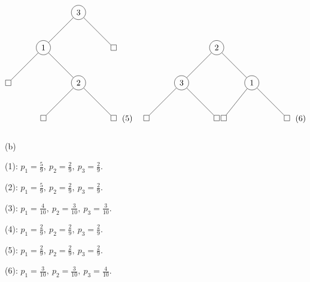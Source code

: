 \documentclass[fleqn]{article}
\begin{document}
$$
\begin{tikzpicture}
    \node(1) at (0,0)[circle, draw]{3};
    \node(2) at (-1.5,-1.5)[circle, draw]{1};
    \node(3) at (0,-3)[circle, draw]{2};
    \node(1l) at (1.5,-1.5)[draw]{};
    \node(2l) at (-3,-3)[draw]{};
    \node(3l) at (1.5,-4.5)[draw]{};
    \node(3r) at (-1.5,-4.5)[draw]{};
    \draw (1)--(2);
    \draw (1)--(1l);
    \draw (2)--(3);
    \draw (2)--(2l);
    \draw (3)--(3l);
    \draw (3)--(3r);
\end{tikzpicture} \ \ (5) \ \ \ \ 
\begin{tikzpicture}
    \node(1) at (0,0)[circle, draw]{2};
    \node(2) at (-1.5,-1.5)[circle, draw]{3};
    \node(3) at (1.5,-1.5)[circle, draw]{1};
    \node(2l) at (-3,-3)[draw]{};
    \node(2r) at (0,-3)[draw]{};
    \node(3l) at (0.3,-3)[draw]{};
    \node(3r) at (3,-3)[draw]{};
    \draw (1)--(2);
    \draw (1)--(3);
    \draw (2)--(2r);
    \draw (2)--(2l);
    \draw (3)--(3l);
    \draw (3)--(3r);
\end{tikzpicture} \ \ (6)
$$
\\
(b)

(1):  $p_1 =\frac{5}{9}, \ p_2 = \frac{2}{9}, \ p_3 = \frac{2}{9}$.

(2):  $p_1 =\frac{5}{9}, \ p_2 = \frac{2}{9}, \ p_3 = \frac{2}{9}$.

(3):  $p_1 =\frac{4}{10}, \ p_2 = \frac{3}{10}, \ p_3 = \frac{3}{10}$.

(4):  $p_1 =\frac{2}{9}, \ p_2 = \frac{2}{9}, \ p_3 = \frac{2}{9}$.

(5):  $p_1 =\frac{2}{9}, \ p_2 = \frac{2}{9}, \ p_3 = \frac{2}{9}$.

(6):  $p_1 =\frac{3}{10}, \ p_2 = \frac{3}{10}, \ p_3 = \frac{4}{10}$.
\end{document}
